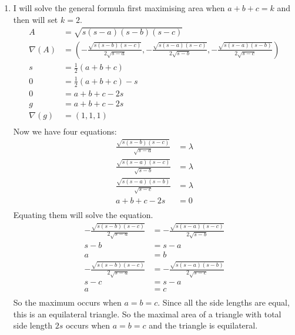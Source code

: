 \documentclass[10pt,\jkfside,a4paper]{article}
\begin{document}
\begin{enumerate}
\item 
I will solve the general formula first maximising area when $a + b + c = k$ and then 
will set $k = 2$.
\begin{equation}
\begin{split}
A &= \sqrt{s(s - a)(s - b)(s - c)} \\
\nabla(A) &= \left(-\frac{\sqrt{s(s - b)(s - c)}}{2\sqrt{s - a}}, -\frac{\sqrt{s(s - a)(s - c)}}{2\sqrt{s - b}}, -\frac{\sqrt{s(s - a)(s - b)}}{2\sqrt{s - c}}\right) \\
s &= \frac{1}{2}(a + b + c) \\
0 &= \frac{1}{2}(a + b + c) - s \\
0 &= a + b + c - 2s \\
g &= a + b + c - 2s \\
\nabla(g) &= (1, 1, 1) \\
\end{split}
\end{equation}
Now we have four equations:
\begin{equation}
\begin{split}
\frac{\sqrt{s(s - b)(s - c)}}{\sqrt{s - a}} &= \lambda \\
\frac{\sqrt{s(s - a)(s - c)}}{\sqrt{s - b}} &= \lambda \\
\frac{\sqrt{s(s - a)(s - b)}}{\sqrt{s - c}} &= \lambda \\
a + b + c - 2s &= 0 \\
\end{split}
\end{equation}
Equating them will solve the equation.
\begin{equation}
\begin{split}
-\frac{\sqrt{s(s - b)(s - c)}}{2\sqrt{s - a}} &= -\frac{\sqrt{s(s - a)(s - c)}}{2\sqrt{s - b}} \\
s - b &= s - a \\
a &= b \\
-\frac{\sqrt{s(s - b)(s - c)}}{2\sqrt{s - a}} &= -\frac{\sqrt{s(s - a)(s - b)}}{2\sqrt{s - c}} \\
s - c &= s - a \\
a &= c \\
\end{split}
\end{equation}
So the maximum occurs when $a = b = c$. Since all the side lengths are equal, this is an 
equilateral triangle. So the maximal area of a triangle with total side length $2s$ occurs 
when $a = b = c$ and the triangle is equilateral.


\end{enumerate}
\end{document}
